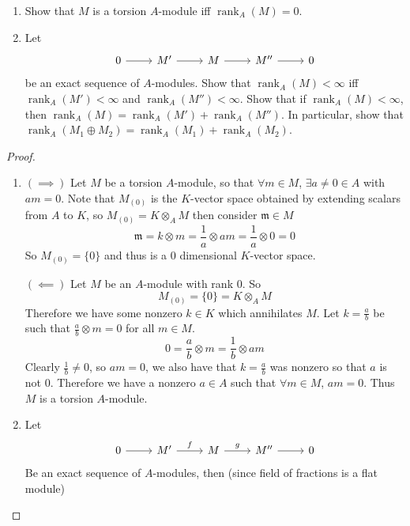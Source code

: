 \documentclass[hidelinks,12pt]{article}
\newcommand{\rk}{\operatorname{rank}}
\begin{document}
\begin{enumerate}
        \begin{enumerate}[label=(\alph*).]
            \item Show that \(M\) is a torsion \(A\)-module iff \(\rk_{A}(M)=0\).
            \item Let \[
                    \begin{tikzcd}
                        0\arrow[r] & M' \arrow[r] & M\arrow[r] & M''\arrow[r] & 0
                    \end{tikzcd}
                \] be an exact sequence of \(A\)-modules. Show that \(\rk_{A}(M)<\infty\) iff \(\rk_{A}(M')<\infty\) and \(\rk_{A}(M'')<\infty\). Show that if \(\rk_{A}(M)<\infty\), then \(\rk_{A}(M)=\rk_{A}(M')+\rk_{A}(M'')\). In particular, show that \(\rk_{A}(M_{1}\oplus M_{2})=\rk_{A}(M_{1})+\rk_{A}(M_{2})\).
        \end{enumerate}
        \begin{proof}
        \begin{enumerate}[label=(\alph*).]
            \item \((\implies)\) Let \(M\) be a torsion \(A\)-module, so that \(\forall m\in M\), \(\exists a\neq0\in A\) with \(am=0\). Note that \(M_{(0)}\) is the \(K\)-vector space obtained by extending scalars from \(A\) to \(K\), so \(M_{(0)}=K\otimes_{A} M\) then consider \(\mathfrak{m}\in M\)
                \[
                    \mathfrak{m}=k\otimes m=\frac{1}{a}\otimes am=\frac{1}{a}\otimes 0=0
                \]
                So \(M_{(0)}=\{0\}\) and thus is a 0 dimensional \(K\)-vector space.
                \par\null\par
                \((\impliedby)\) Let \(M\) be an \(A\)-module with rank 0. So \[M_{(0)}=\{0\}=K\otimes_{A} M\] Therefore we have some nonzero \(k\in K\) which annihilates \(M\). Let \(k=\frac{a}{b}\) be such that \(\frac{a}{b}\otimes m=0\) for all \(m\in M\). \[
                0=\frac{a}{b}\otimes m=\frac{1}{b}\otimes am
                \]
                Clearly \(\frac{1}{b}\neq0\), so \(am=0\), we also have that \(k=\frac{a}{b}\) was nonzero so that \(a\) is not 0. Therefore we have a nonzero \(a\in A\) such that \(\forall m\in M\), \(am=0\). Thus \(M\) is a torsion \(A\)-module.
            \item Let \[
                    \begin{tikzcd}
                        0\arrow[r] & M' \arrow[r, "f"] & M\arrow[r, "g"] & M''\arrow[r] & 0
                    \end{tikzcd}
            \]
           Be an exact sequence of \(A\)-modules, then (since field of fractions is a flat module) \[
\]
\end{enumerate}
\end{proof}
\end{enumerate}
\end{document}
